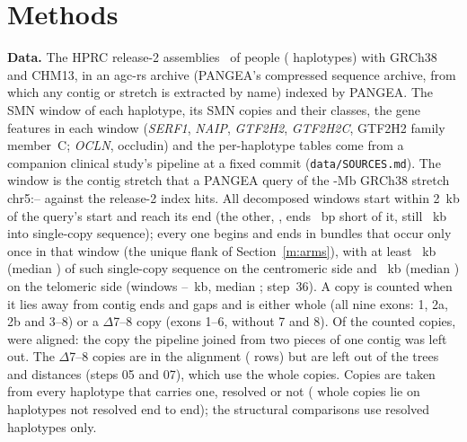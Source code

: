 \documentclass[10pt]{article}
\begin{document}
\section{Methods}\label{m:methods}
\textbf{Data.} The HPRC release-2 assemblies~\cite{lucas2026} of \nPeopleAll{} people (\nHapsAll{} haplotypes) with GRCh38 and CHM13,
in an agc-rs archive (PANGEA's compressed sequence archive, from which any contig or stretch is extracted by name) indexed by PANGEA. The SMN window of each haplotype, its SMN copies and their classes, the gene
features in each window (\emph{SERF1}, \emph{NAIP}, \emph{GTF2H2}, \emph{GTF2H2C}, GTF2H2 family member~C; \emph{OCLN}, occludin) and the per-haplotype
tables come from a companion clinical study's pipeline at a fixed commit (\texttt{data/SOURCES.md}). The window is the contig stretch that a PANGEA query of the \wfQueryMb-Mb GRCh38 stretch chr5:\wfGStart--\wfGEnd{} against the release-2 index hits. All \wfN{} decomposed windows start within 2~kb of the query's start and \wfReachEnd{} reach its end (the other, \wfShortHap, ends \wfShortBp~bp short of it, still \wfShortTelKb~kb into single-copy sequence); every one begins and ends in bundles that occur only once in that window (the unique flank of Section~\ref{m:arms}), with at least \wfCenMin~kb (median \wfCenMed) of such single-copy sequence on the centromeric side and \wfTelMin~kb (median \wfTelMed) on the telomeric side (windows \wfLenMin--\wfLenMax~kb, median \wfLenMed; step~36). A copy is
counted when it lies away from contig ends and gaps and is either whole (all nine exons: 1, 2a, 2b and 3--8) or a
$\Delta$7--8 copy (exons 1--6, without 7 and 8). Of the \nCounted{} counted copies, \nAligned{} were aligned: the
\nJoined{} copy the pipeline joined from two pieces of one contig was left out. The \nDelLeftOut{} $\Delta$7--8 copies are in the alignment
(\nAlnRows{} rows) but are left out of the trees and distances (steps 05 and 07), which use the \nCopies{} whole copies. Copies are taken from every haplotype that carries one, resolved or not (\nCopiesUnres{} whole copies lie on \nCopiesUnresHaps{} haplotypes not resolved end to end); the structural comparisons use resolved haplotypes only.
\end{document}
